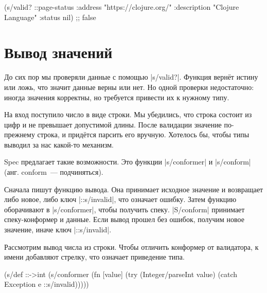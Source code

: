 \begin{english}
  \begin{clojure}
(s/valid? ::page-status
          {:address "https://clojure.org/"
           :description "Clojure Language"
           :status nil})
;; false
  \end{clojure}
\end{english}

\section{Вывод значений}

\label{spec-conform}


До сих пор мы проверяли данные с помощью \spverb|s/valid?|. Функция верн\"{е}т
истину или ложь, что значит данные верны или нет. Но одной проверки
недостаточно: иногда значения корректны, но требуется привести их к нужному
типу.

На вход поступило число в виде строки. Мы убедились, что строка состоит из цифр
и не превышает допустимой длины. После валидации значение по-прежнему строка, и
прид\"{е}тся парсить его вручную. Хотелось бы, чтобы типы выводил за нас какой-то
механизм.


Spec предлагает такие возможности. Это функции \spverb|s/conformer| и
\spverb|s/conform| (анг. conform~--- подчиняться).

\label{spec-invalid}



Сначала пишут функцию вывода. Она принимает исходное значение и возвращает либо
новое, либо ключ \spverb|::s/invalid|, что означает ошибку. Затем функцию
оборачивают в \spverb|s/conformer|, чтобы получить спеку. \spverb|S/conform|
принимает спеку-конформер и данные. Если вывод прошел без ошибок, получим новое
значение, иначе ключ \spverb|::s/invalid|.

Рассмотрим вывод числа из строки. Чтобы отличить конформер от валидатора, к
имени добавляют стрелку, что означает приведение типа.

\begin{english}
  \begin{clojure}
(s/def ::->int
  (s/conformer
   (fn [value]
     (try
       (Integer/parseInt value)
       (catch Exception e
         ::s/invalid)))))
  \end{clojure}
\end{english}

